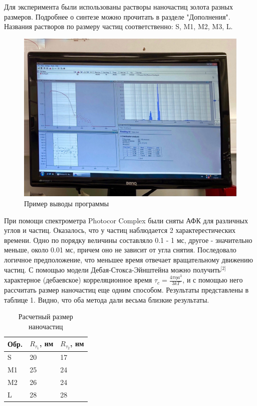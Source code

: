 \documentclass[a4paper,12pt]{article} %
\begin{document}
Для эксперимента были использованы растворы наночастиц золота разных размеров. Подробнее о синтезе можно прочитать в разделе "Дополнения". Названия растворов по размеру частиц соответственно: S, M1, M2, M3, L.

\begin{figure}[h!]
    \includegraphics[width=1\textwidth]{222163047_457267330.jpg}
    \caption{Пример выводы программы}
\end{figure}

При помощи  спектрометра Photocor Complex были сняты АФК для различных углов и частиц. Оказалось, что у частиц наблюдается 2 характерестических времени. Одно по порядку величины составляло 0.1 - 1 мс, другое - значительно меньше, около 0.01 мс, причем оно не зависит от угла снятия. Последовало логичное предположение, что меньшее время отвечает вращательному движению частиц. С помощью модели Дебая-Стокса-Эйнштейна можно получить$^\text{[2]}$ характерное (дебаевское) корреляционное время $\tau_c = \frac{4\pi \eta a^3}{3kT}$, и с помощью него рассчитать размер наночастиц еще одним способом. Результаты представлены в таблице 1. Видно, что оба метода дали весьма близкие результаты.


\begin{table}[h]
\begin{center}
\caption{Расчетный размер наночастиц}
\begin{tabular}{|l|l|l|}
\hline
Обр. & $R_{\tau_1}$, нм & $R_{\tau_2}$, нм \\ \hline
S       & 20               & 17               \\ \hline
M1      & 25               & 24               \\ \hline
M2      & 26               & 24               \\ \hline
L       & 28               & 28               \\ \hline
\end{tabular}
\end{center}
\end{table}
\end{document}
